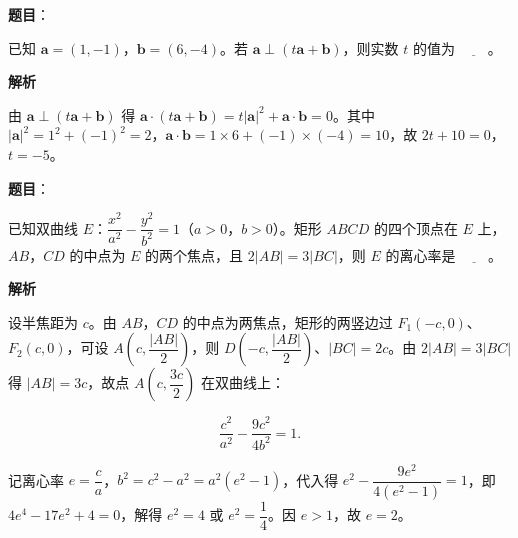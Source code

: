 \begin{answer}

\textbf{题目}：

已知 \(\boldsymbol{a}=(1,-1)\)，\(\boldsymbol{b}=(6,-4)\)。若 \(\boldsymbol{a}\perp(t\boldsymbol{a}+\boldsymbol{b})\)，则实数 \(t\) 的值为 \(\underline{\qquad}\)。

\textbf{解析}

由 \(\boldsymbol{a}\perp(t\boldsymbol{a}+\boldsymbol{b})\) 得 \(\boldsymbol{a}\cdot(t\boldsymbol{a}+\boldsymbol{b})=t|\boldsymbol{a}|^{2}+\boldsymbol{a}\cdot\boldsymbol{b}=0\)。其中 \(|\boldsymbol{a}|^{2}=1^{2}+(-1)^{2}=2\)，\(\boldsymbol{a}\cdot\boldsymbol{b}=1\times 6+(-1)\times(-4)=10\)，故 \(2t+10=0\)，\(t=-5\)。


\end{answer}
\begin{answer}

\textbf{题目}：

已知双曲线 \(E\)：\(\dfrac{x^2}{a^2}-\dfrac{y^2}{b^2}=1\)（\(a>0\)，\(b>0\)）。矩形 \(ABCD\) 的四个顶点在 \(E\) 上，\(AB\)，\(CD\) 的中点为 \(E\) 的两个焦点，且 \(2|AB|=3|BC|\)，则 \(E\) 的离心率是 \(\underline{\qquad}\)。

\textbf{解析}

设半焦距为 \(c\)。由 \(AB\)，\(CD\) 的中点为两焦点，矩形的两竖边过 \(F_{1}(-c,0)\)、\(F_{2}(c,0)\)，可设 \(A\left(c,\dfrac{|AB|}{2}\right)\)，则 \(D\left(-c,\dfrac{|AB|}{2}\right)\)、\(|BC|=2c\)。由 \(2|AB|=3|BC|\) 得 \(|AB|=3c\)，故点 \(A\left(c,\dfrac{3c}{2}\right)\) 在双曲线上：

\nopagebreak[4]
\[
\dfrac{c^{2}}{a^{2}}-\dfrac{9c^{2}}{4b^{2}}=1.
\]

记离心率 \(e=\dfrac{c}{a}\)，\(b^{2}=c^{2}-a^{2}=a^{2}(e^{2}-1)\)，代入得 \(e^{2}-\dfrac{9e^{2}}{4(e^{2}-1)}=1\)，即 \(4e^{4}-17e^{2}+4=0\)，解得 \(e^{2}=4\) 或 \(e^{2}=\dfrac{1}{4}\)。因 \(e>1\)，故 \(e=2\)。


\end{answer}
